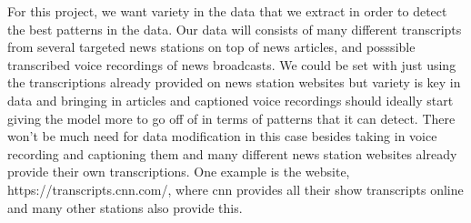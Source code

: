 For this project, we want variety in the data that we extract in order to detect the best patterns in the data. Our data will consists of many different transcripts from several targeted news stations on top of news articles, and posssible transcribed voice recordings of news broadcasts. We could be set with just using the transcriptions already provided on news station websites but variety is key in data and bringing in articles and captioned voice recordings should ideally start giving the model more to go off of in terms of patterns that it can detect. There won't be much need for data modification in this case besides taking in voice recording and captioning them and many different news station websites already provide their own transcriptions. One example is the website, https://transcripts.cnn.com/, where cnn provides all their show transcripts online and many other stations also provide this. 
